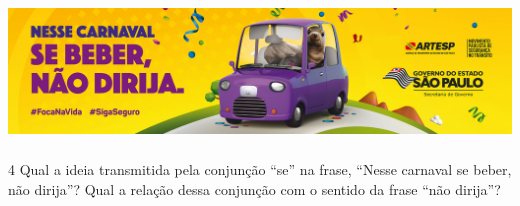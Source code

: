 \includegraphics[width=5.90551in,height=1.47222in]{./imgSAEB_7_POR/media/image10.png}



\num{4} Qual a ideia transmitida pela conjunção ``se'' na frase, 
``Nesse carnaval se beber, não dirija''? Qual a relação dessa conjunção 
com o sentido da frase ``não dirija''?






